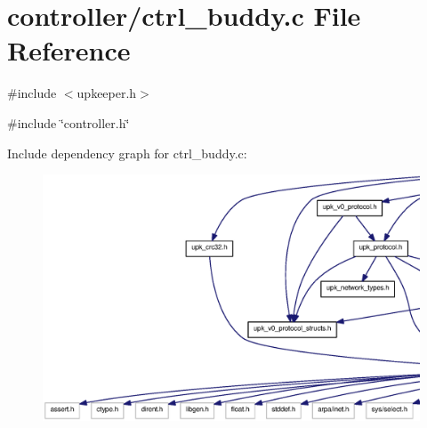 \section{controller/ctrl\_\-buddy.c File Reference}
\label{ctrl__buddy_8c}
{\ttfamily \#include $<$upkeeper.h$>$}\par
{\ttfamily \#include \char`\"{}controller.h\char`\"{}}\par
Include dependency graph for ctrl\_\-buddy.c:\nopagebreak
\begin{figure}[H]
\begin{center}
\leavevmode
\includegraphics[width=400pt]{ctrl__buddy_8c__incl}
\end{center}
\end{figure}
